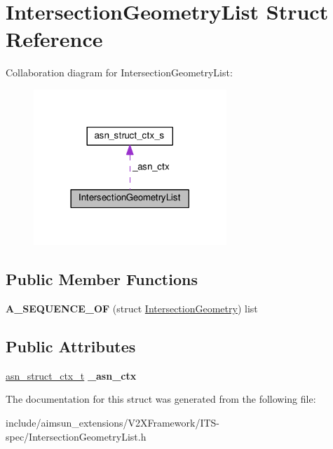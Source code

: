 \hypertarget{structIntersectionGeometryList}{}\section{Intersection\+Geometry\+List Struct Reference}
\label{structIntersectionGeometryList}


Collaboration diagram for Intersection\+Geometry\+List\+:\nopagebreak
\begin{figure}[H]
\begin{center}
\leavevmode
\includegraphics[width=206pt]{structIntersectionGeometryList__coll__graph}
\end{center}
\end{figure}
\subsection*{Public Member Functions}
\begin{DoxyCompactItemize}
\item 
{\bfseries A\+\_\+\+S\+E\+Q\+U\+E\+N\+C\+E\+\_\+\+OF} (struct \hyperlink{structIntersectionGeometry}{Intersection\+Geometry}) list\hypertarget{structIntersectionGeometryList_ab441805713cbfdafc52093a44035a0db}{}\label{structIntersectionGeometryList_ab441805713cbfdafc52093a44035a0db}

\end{DoxyCompactItemize}
\subsection*{Public Attributes}
\begin{DoxyCompactItemize}
\item 
\hyperlink{structasn__struct__ctx__s}{asn\+\_\+struct\+\_\+ctx\+\_\+t} {\bfseries \+\_\+asn\+\_\+ctx}\hypertarget{structIntersectionGeometryList_a6e9432f622f2321475469c15f5d7e18b}{}\label{structIntersectionGeometryList_a6e9432f622f2321475469c15f5d7e18b}

\end{DoxyCompactItemize}


The documentation for this struct was generated from the following file\+:\begin{DoxyCompactItemize}
\item 
include/aimsun\+\_\+extensions/\+V2\+X\+Framework/\+I\+T\+S-\/spec/Intersection\+Geometry\+List.\+h\end{DoxyCompactItemize}
